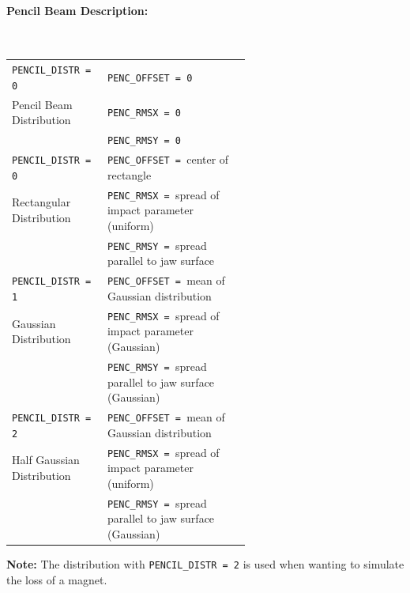 \paragraph{Pencil Beam Description:}~\\
\begin{tabular}{@{}l|p{0.6\linewidth}}
    \texttt{PENCIL\_DISTR = 0} & \texttt{PENC\_OFFSET  = 0} \\
    Pencil Beam Distribution   & \texttt{PENC\_RMSX    = 0} \\
                               & \texttt{PENC\_RMSY    = 0} \\
    \hline
    \texttt{PENCIL\_DISTR = 0} & \texttt{PENC\_OFFSET  = }center of rectangle \\
    Rectangular Distribution   & \texttt{PENC\_RMSX    = }spread of impact parameter (uniform) \\
                               & \texttt{PENC\_RMSY    = }spread parallel to jaw surface \\
    \hline
    \texttt{PENCIL\_DISTR = 1} & \texttt{PENC\_OFFSET  = }mean of Gaussian distribution \\
    Gaussian Distribution      & \texttt{PENC\_RMSX    = }spread of impact parameter (Gaussian) \\
                               & \texttt{PENC\_RMSY    = }spread parallel to jaw surface (Gaussian) \\
    \hline
    \texttt{PENCIL\_DISTR = 2} & \texttt{PENC\_OFFSET  = }mean of Gaussian distribution \\
    Half Gaussian Distribution & \texttt{PENC\_RMSX    = }spread of impact parameter (uniform) \\
                               & \texttt{PENC\_RMSY    = }spread parallel to jaw surface (Gaussian) \\
\end{tabular}

\bigskip
\noindent\textbf{Note:} The distribution with \texttt{PENCIL\_DISTR = 2} is used when wanting to simulate the loss of a magnet.


